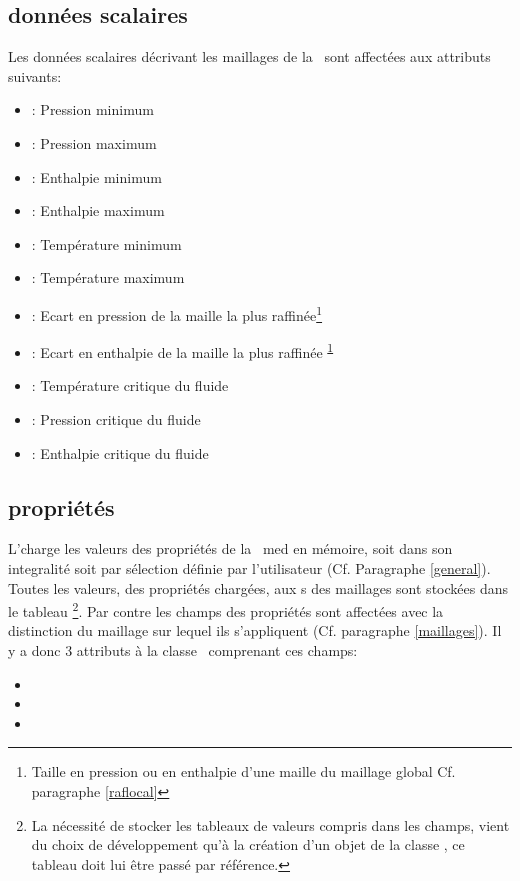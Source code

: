     \subsection{données scalaires}
    Les données scalaires décrivant les maillages de la \bdd\ sont affectées aux attributs suivants:
    \vspace{0.3cm}
    \begin{itemize}
      \item {}: Pression minimum
      \item {}: Pression maximum
      \item {}: Enthalpie minimum
      \item {}: Enthalpie maximum
      \item {}: Température minimum
      \item {}: Température maximum
      \item {}: Ecart en pression de la maille la plus raffinée\footnote{Taille en pression ou en enthalpie 
      d'une maille du maillage global Cf. paragraphe \ref{raflocal}\label{delta}}
      \item {}: Ecart en enthalpie de la maille la plus raffinée\textsuperscript{ \ref{delta}}
      \item {}: Température critique du fluide
      \item {}: Pression critique du fluide
      \item {}: Enthalpie critique du fluide
    \end{itemize}
    \vspace{0.5cm}
    
    \subsection{propriétés}
    L'\ipp charge les valeurs des propriétés de la \bdd\ med en mémoire,
    soit dans son integralité soit par sélection définie par l'utilisateur (Cf. Paragraphe \ref{general}).
    \smallbreak\vspace{0.3cm}
    Toutes les valeurs, des propriétés chargées, aux \n s des maillages
    sont stockées dans le tableau \footnote{La nécessité de stocker les tableaux
    de valeurs compris dans les champs, vient du choix de développement qu'à la création d'un objet de la classe \FIELD,
    ce tableau doit lui être passé par référence.\label{field}}.
    Par contre les champs des propriétés sont affectées avec la distinction du maillage sur lequel ils s'appliquent 
    (Cf. paragraphe \ref{maillages}). Il y a donc 3 attributs à la classe \IPP\ comprenant ces champs:
    \vspace{0.3cm}
    \begin{itemize}
      \item {} 
      \item {} 
      \item {} 
    \end{itemize}
    \vspace{0.5cm}
    
